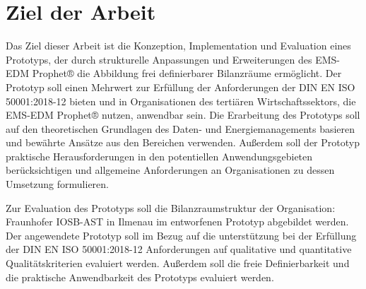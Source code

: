 \section{Ziel der Arbeit}

Das Ziel dieser Arbeit ist die Konzeption, Implementation und Evaluation eines Prototyps, der durch strukturelle Anpassungen und 
Erweiterungen des EMS-EDM Prophet® die Abbildung frei definierbarer Bilanzräume ermöglicht. Der Prototyp soll einen Mehrwert zur 
Erfüllung der Anforderungen der DIN EN ISO 50001:2018-12 bieten und in Organisationen des tertiären Wirtschaftssektors, die EMS-EDM Prophet® nutzen, 
anwendbar sein. Die Erarbeitung des Prototyps soll auf den theoretischen Grundlagen des Daten- und Energiemanagements basieren und bewährte Ansätze 
aus den Bereichen verwenden. Außerdem soll der Prototyp praktische Herausforderungen in den potentiellen Anwendungsgebieten berücksichtigen und 
allgemeine Anforderungen an Organisationen zu dessen Umsetzung formulieren.


Zur Evaluation des Prototyps soll die Bilanzraumstruktur der Organisation: Fraunhofer IOSB-AST in Ilmenau im entworfenen Prototyp abgebildet werden.
Der angewendete Prototyp soll im Bezug auf die unterstützung bei der Erfüllung der DIN EN ISO 50001:2018-12 Anforderungen auf qualitative und quantitative 
Qualitätskriterien evaluiert werden.
Außerdem soll die freie Definierbarkeit und die praktische Anwendbarkeit des Prototyps evaluiert werden.
